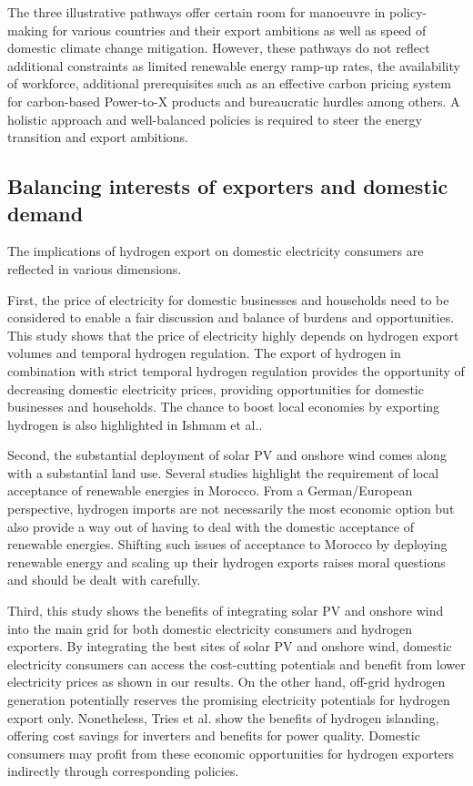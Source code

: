 The three illustrative pathways offer certain room for manoeuvre in policy-making for various countries and their export ambitions as well as speed of domestic climate change mitigation. However, these pathways do not reflect additional constraints as limited renewable energy ramp-up rates, the availability of workforce, additional prerequisites such as an effective carbon pricing system for carbon-based Power-to-X products and bureaucratic hurdles among others. A holistic approach and well-balanced policies is required to steer the energy transition and export ambitions.


\subsection*{Balancing interests of exporters and domestic demand}
\label{subsec:balancedinterests}
The implications of hydrogen export on domestic electricity consumers are reflected in various dimensions. 

First, the price of electricity for domestic businesses and households need to be considered to enable a fair discussion and balance of burdens and opportunities. This study shows that the price of electricity highly depends on hydrogen export volumes and temporal hydrogen regulation. The export of hydrogen in combination with strict temporal hydrogen regulation provides the opportunity of decreasing domestic electricity prices, providing opportunities for domestic businesses and households. The chance to boost local economies by exporting hydrogen is also highlighted in Ishmam et al.\cite{Ishmam2024}.

Second, the substantial deployment of solar PV and onshore wind comes along with a substantial land use. Several studies \cite{Terrapon-Pfaff2019, Hanger2016} highlight the requirement of local acceptance of renewable energies in Morocco. From a German/European perspective, hydrogen imports are not necessarily the most economic option \cite{Merten2023} but also provide a way out of having to deal with the domestic acceptance of renewable energies.
Shifting such issues of acceptance to Morocco by deploying renewable energy and scaling up their hydrogen exports raises moral questions and should be dealt with carefully. 

Third, this study shows the benefits of integrating solar PV and onshore wind into the main grid for both domestic electricity consumers and hydrogen exporters. By integrating the best sites of solar PV and onshore wind, domestic electricity consumers can access the cost-cutting potentials and benefit from lower electricity prices as shown in our results. On the other hand, off-grid hydrogen generation potentially reserves the promising electricity potentials for hydrogen export only. Nonetheless, Tries et al.\cite{Tries2023b} show the benefits of hydrogen islanding, offering cost savings for inverters and benefits for power quality. Domestic consumers may profit from these economic opportunities for hydrogen exporters indirectly through corresponding policies.

